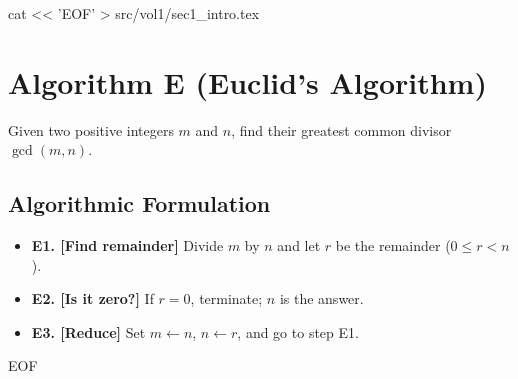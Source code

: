 cat << 'EOF' > src/vol1/sec1_intro.tex
\section{Algorithm E (Euclid's Algorithm)}
Given two positive integers $m$ and $n$, find their greatest common divisor $\gcd(m, n)$.

\subsection{Algorithmic Formulation}
\begin{itemize}
    \item \textbf{E1. [Find remainder]} Divide $m$ by $n$ and let $r$ be the remainder ($0 \le r < n$).
    \item \textbf{E2. [Is it zero?]} If $r = 0$, terminate; $n$ is the answer.
    \item \textbf{E3. [Reduce]} Set $m \leftarrow n$, $n \leftarrow r$, and go to step E1.
\end{itemize}
EOF